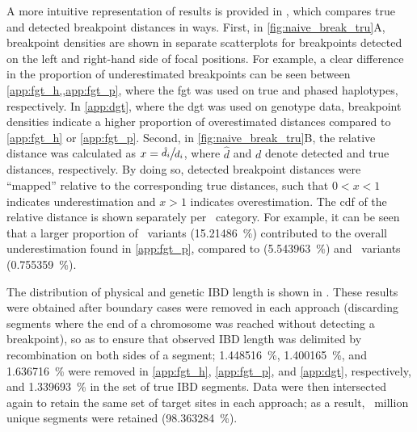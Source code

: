 %

%

A more intuitive representation of results is provided in , which compares true and detected breakpoint distances in  ways.
First, in \cref{fig:naive_break_tru}{A}, breakpoint densities are shown in separate scatterplots for breakpoints detected on the left and right-hand side of focal positions.
For example, a clear difference in the proportion of underestimated breakpoints can be seen between \cref{app:fgt_h,,app:fgt_p}, \ie where the \gls{fgt} was used on true and phased haplotypes, respectively.
In \cref{app:dgt}, where the \gls{dgt} was used on genotype data, breakpoint densities indicate a higher proportion of overestimated distances compared to \ref{app:fgt_h} or \ref{app:fgt_p}.
Second, in \cref{fig:naive_break_tru}{B}, the relative distance was calculated as ${x=\large \sfrac{\hat{d}_i}{d_i}}$, where $\hat{d}$ and $d$ denote detected and true distances, respectively.
By doing so, detected breakpoint distances were ``mapped'' relative to the corresponding true distances, such that ${0<x<1}$ indicates underestimation and ${x>1}$ indicates overestimation.
The \gls{cdf} of the relative distance is shown separately per \fk{}~category.
For example, it can be seen that a larger proportion of ~variants (\SI{15.21486}{\percent}) contributed to the overall underestimation found in \cref{app:fgt_p}, \eg compared to  (\SI{5.543963}{\percent}) and ~variants (\SI{0.755359}{\percent}).


%

%

The distribution of physical and genetic IBD length is shown in .
These results were obtained after boundary cases were removed in each approach (\ie discarding segments where the end of a chromosome was reached without detecting a breakpoint), so as to ensure that observed IBD length was delimited by recombination on both sides of a segment; \SI{1.448516}{\percent}, \SI{1.400165}{\percent}, and \SI{1.636716}{\percent}
were removed in \ref{app:fgt_h}, \ref{app:fgt_p}, and \ref{app:dgt}, respectively, and \SI{1.339693}{\percent} in the set of true IBD segments.
Data were then intersected again to retain the same set of target sites in each approach; as a result, ~million unique segments were retained (\SI{98.363284}{\percent}).

